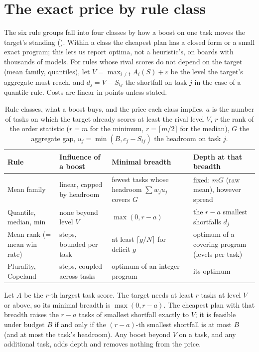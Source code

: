 \section{The exact price by rule class}
\label{sec:exact}

The six rule groups fall into four classes by how a boost on one task moves the target's standing (). Within a class the cheapest plan has a closed form or a small exact program; this lets us report optima, not a heuristic's, on boards with thousands of models. For rules whose rival scores do not depend on the target (mean family, quantiles), let $V=\max_{i\ne t}A_i(S)+\varepsilon$ be the level the target's aggregate must reach, and $d_j=V-S_{tj}$ the shortfall on task $j$ in the case of a quantile rule. Costs are linear in points unless stated.

\begin{table}[t]
\caption{Rule classes, what a boost buys, and the price each class implies. $a$ is the number of tasks on which the target already scores at least the rival level $V$, $r$ the rank of the order statistic ($r=m$ for the minimum, $r=\lceil m/2\rceil$ for the median), $G$ the aggregate gap, $u_j=\min(B,c_j-S_{tj})$ the headroom on task $j$.}
\label{tab:rules}
\centering\small
\begin{tabular}{@{}p{2.3cm}p{2.7cm}p{3.1cm}p{3.0cm}@{}}
\toprule
Rule & Influence of a boost & Minimal breadth & Depth at that breadth\\
\midrule
Mean family & linear, capped by headroom & fewest tasks whose headroom $\sum w_ju_j$ covers $G$ & fixed: $mG$ (raw mean), however spread\\
Quantile, median, min & none beyond level $V$ & $\max(0,r-a)$ & the $r-a$ smallest shortfalls $d_j$\\
Mean rank (= mean win rate) & steps, bounded per task & at least $\lceil g/N\rceil$ for deficit $g$ & optimum of a covering program (levels per task)\\
Plurality, Copeland & steps, coupled across tasks & optimum of an integer program & its optimum\\
\bottomrule
\end{tabular}
\end{table}

\begin{proposition}\label{prop:quantile}
Let $A$ be the $r$-th largest task score. The target needs at least $r$ tasks at level $V$ or above, so its minimal breadth is $\max(0,r-a)$. The cheapest plan with that breadth raises the $r-a$ tasks of smallest shortfall exactly to $V$; it is feasible under budget $B$ if and only if the $(r-a)$-th smallest shortfall is at most $B$ (and at most the task's headroom). Any boost beyond $V$ on a task, and any additional task, adds depth and removes nothing from the price.
\end{proposition}

